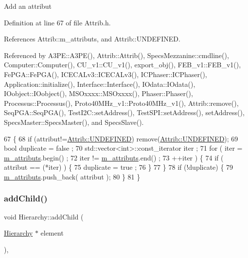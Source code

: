 Add an attribut 

Definition at line 67 of file Attrib.\+h.



References Attrib\+::m\+\_\+attributs, and Attrib\+::\+U\+N\+D\+E\+F\+I\+N\+ED.



Referenced by A3\+P\+E\+::\+A3\+P\+E(), Attrib\+::\+Attrib(), Specs\+Mezzanine\+::cmdline(), Computer\+::\+Computer(), C\+U\+\_\+v1\+::\+C\+U\+\_\+v1(), export\+\_\+obj(), F\+E\+B\+\_\+v1\+::\+F\+E\+B\+\_\+v1(), Fe\+P\+G\+A\+::\+Fe\+P\+G\+A(), I\+C\+E\+C\+A\+Lv3\+::\+I\+C\+E\+C\+A\+Lv3(), I\+C\+Phaser\+::\+I\+C\+Phaser(), Application\+::initialize(), Interface\+::\+Interface(), I\+Odata\+::\+I\+Odata(), I\+Oobject\+::\+I\+Oobject(), M\+S\+Oxxxx\+::\+M\+S\+Oxxxx(), Phaser\+::\+Phaser(), Processus\+::\+Processus(), Proto40\+M\+Hz\+\_\+v1\+::\+Proto40\+M\+Hz\+\_\+v1(), Attrib\+::remove(), Seq\+P\+G\+A\+::\+Seq\+P\+G\+A(), Test\+I2\+C\+::set\+Address(), Test\+S\+P\+I\+::set\+Address(), set\+Address(), Specs\+Master\+::\+Specs\+Master(), and Specs\+Slave().


\begin{DoxyCode}
67                             \{
68     \textcolor{keywordflow}{if} (attribut!=\hyperlink{classAttrib_a69e171d7cc6417835a5a306d3c764235a3a8da2ab97dda18aebab196fe4100531}{Attrib::UNDEFINED}) \textcolor{keyword}{remove}(\hyperlink{classAttrib_a69e171d7cc6417835a5a306d3c764235a3a8da2ab97dda18aebab196fe4100531}{Attrib::UNDEFINED});
69     \textcolor{keywordtype}{bool} duplicate = false ;
70     std::vector<int>::const\_iterator iter ;
71     \textcolor{keywordflow}{for} ( iter  = \hyperlink{classAttrib_ac4bd58a0cc6b38a3b711d609a3d3aacc}{m\_attributs}.begin() ;
72           iter != \hyperlink{classAttrib_ac4bd58a0cc6b38a3b711d609a3d3aacc}{m\_attributs}.end()   ;
73           ++iter ) \{
74       \textcolor{keywordflow}{if} ( attribut == (*iter) ) \{
75         duplicate = true ;
76       \}
77     \}
78     \textcolor{keywordflow}{if} (!duplicate) \{
79       \hyperlink{classAttrib_ac4bd58a0cc6b38a3b711d609a3d3aacc}{m\_attributs}.push\_back( attribut );
80     \}
81   \}
\end{DoxyCode}
\mbox{\label{classHierarchy_ad677774ff38fcb257c04a3a10d471fac}} 
\subsubsection{\texorpdfstring{add\+Child()}{addChild()}}
{\footnotesize\ttfamily void Hierarchy\+::add\+Child (\begin{DoxyParamCaption}\item[{\hyperlink{classHierarchy}{Hierarchy} $\ast$}]{element }\end{DoxyParamCaption})\hspace{0.3cm}{\ttfamily [virtual]}, {\ttfamily [inherited]}}



